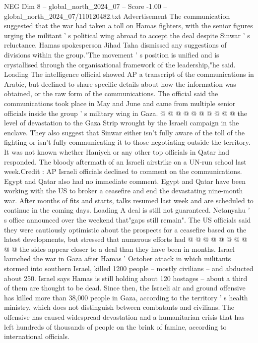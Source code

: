 \begin{textsample}{NEG Dim 8 – global\_north\_2024\_07 – Score -1.00 – global\_north\_2024\_07/110120482.txt}
Advertisement The communication suggested that the war had taken a toll on Hamas fighters, with the senior figures urging the militant ' s political wing abroad to accept the deal despite Sinwar ' s reluctance.
Hamas spokesperson Jihad Taha dismissed any suggestions of divisions within the group."The movement ' s position is unified and is crystallised through the organisational framework of the leadership,"he said.
Loading The intelligence official showed AP a transcript of the communications in Arabic, but declined to share specific details about how the information was obtained, or the raw form of the communications.
The official said the communications took place in May and June and came from multiple senior officials inside the group ' s military wing in Gaza. @ @ @ @ @ @ @ @ @ @ the level of devastation to the Gaza Strip wrought by the Israeli campaign in the enclave.
They also suggest that Sinwar either isn't fully aware of the toll of the fighting or isn't fully communicating it to those negotiating outside the territory.
It was not known whether Haniyeh or any other top officials in Qatar had responded.
The bloody aftermath of an Israeli airstrike on a UN-run school last week.Credit : AP Israeli officials declined to comment on the communications.
Egypt and Qatar also had no immediate comment.
Egypt and Qatar have been working with the US to broker a ceasefire and end the devastating nine-month war.
After months of fits and starts, talks resumed last week and are scheduled to continue in the coming days.
Loading A deal is still not guaranteed.
Netanyahu ' s office announced over the weekend that"gaps still remain".
The US officials said they were cautiously optimistic about the prospects for a ceasefire based on the latest developments, but stressed that numerous efforts had @ @ @ @ @ @ @ @ @ @ the sides appear closer to a deal than they have been in months.
Israel launched the war in Gaza after Hamas ' October attack in which militants stormed into southern Israel, killed 1200 people -- mostly civilians -- and abducted about 250.
Israel says Hamas is still holding about 120 hostages -- about a third of them are thought to be dead.
Since then, the Israeli air and ground offensive has killed more than 38,000 people in Gaza, according to the territory ' s health ministry, which does not distinguish between combatants and civilians.
The offensive has caused widespread devastation and a humanitarian crisis that has left hundreds of thousands of people on the brink of famine, according to international officials.

\end{textsample}
